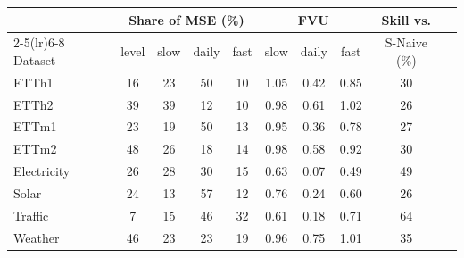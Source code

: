 \begin{tabular}{lccccccccc}
\toprule
& \multicolumn{4}{c}{Share of MSE (\%)} & \multicolumn{3}{c}{FVU} & Skill vs. \\
\cmidrule(lr){2-5}\cmidrule(lr){6-8}
Dataset & level & slow & daily & fast & slow & daily & fast & S-Naive (\%) \\
\midrule
ETTh1 & 16 & 23 & 50 & 10 & 1.05 & 0.42 & 0.85 & 30 \\
ETTh2 & 39 & 39 & 12 & 10 & 0.98 & 0.61 & 1.02 & 26 \\
ETTm1 & 23 & 19 & 50 & 13 & 0.95 & 0.36 & 0.78 & 27 \\
ETTm2 & 48 & 26 & 18 & 14 & 0.98 & 0.58 & 0.92 & 30 \\
Electricity & 26 & 28 & 30 & 15 & 0.63 & 0.07 & 0.49 & 49 \\
Solar & 24 & 13 & 57 & 12 & 0.76 & 0.24 & 0.60 & 26 \\
Traffic & 7 & 15 & 46 & 32 & 0.61 & 0.18 & 0.71 & 64 \\
Weather & 46 & 23 & 23 & 19 & 0.96 & 0.75 & 1.01 & 35 \\
\bottomrule
\end{tabular}